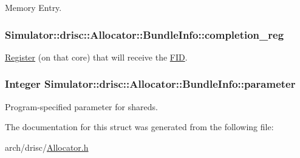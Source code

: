 Memory Entry. 

\hypertarget{struct_simulator_1_1drisc_1_1_allocator_1_1_bundle_info_a99ab65509b8de61dd8fb113e1024c26e}{
\subsubsection[{completion\+\_\+reg}]{ Simulator\+::drisc\+::\+Allocator\+::\+Bundle\+Info\+::completion\+\_\+reg}}\label{struct_simulator_1_1drisc_1_1_allocator_1_1_bundle_info_a99ab65509b8de61dd8fb113e1024c26e}


\hyperlink{class_simulator_1_1_register}{Register} (on that core) that will receive the \hyperlink{struct_simulator_1_1_f_i_d}{F\+I\+D}. 

\hypertarget{struct_simulator_1_1drisc_1_1_allocator_1_1_bundle_info_a551bcce9a574f1e9731b2949046c9d5f}{
\subsubsection[{parameter}]{\setlength{\rightskip}{0pt plus 5cm}Integer Simulator\+::drisc\+::\+Allocator\+::\+Bundle\+Info\+::parameter}}\label{struct_simulator_1_1drisc_1_1_allocator_1_1_bundle_info_a551bcce9a574f1e9731b2949046c9d5f}


Program-\/specified parameter for shareds. 



The documentation for this struct was generated from the following file\+:\begin{DoxyCompactItemize}
\item 
arch/drisc/\hyperlink{_allocator_8h}{Allocator.\+h}\end{DoxyCompactItemize}
